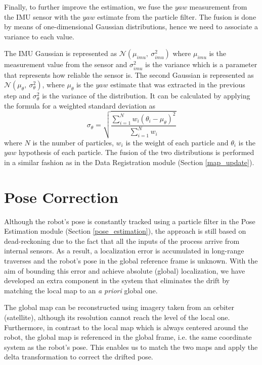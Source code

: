 Finally, to further improve the estimation, we fuse the $yaw$ measurement from
the IMU sensor with the $yaw$ estimate from the particle filter.
The fusion is done by means of one-dimensional Gaussian distributions,
hence we need to associate a variance to each value.

The IMU Gaussian is represented as $\mathcal{N}(\mu_{imu} ,\ \sigma^2_{imu})$
where $\mu_{imu}$ is the measurement value from the sensor and
$\sigma^2_{imu}$ is the variance which is a parameter that represents how
reliable the sensor is.
The second Gaussian is represented as
$\mathcal{N}(\mu_{\theta} ,\ \sigma^2_{\theta})$,
where $\mu_{\theta}$ is the $yaw$ estimate that was extracted in the
previous step and $\sigma^2_{\theta}$ is the variance of the distribution.
It can be calculated by applying the formula for a weighted standard
deviation as
\begin{equation}
    \sigma_\theta = \sqrt{\frac
    {\sum\limits^{N}_{i=1} w_i (\theta_i - \mu_\theta)^2}
    {\sum\limits^{N}_{i=1} w_i}}
\end{equation}
where
$N$ is the number of particles,
$w_i$ is the weight of each particle and
$\theta_i$ is the $yaw$ hypothesis of each particle.
The fusion of the two distributions is performed in a similar fashion as
in the Data Registration module (Section \ref{map_update}).

\section{Pose Correction} \label{pose_correction}

Although the robot's pose is constantly tracked using a particle filter in the
Pose Estimation module (Section \ref{pose_estimation}), the approach
is still based on dead-reckoning due to the fact that all the inputs
of the process arrive from internal sensors.
As a result, a localization error is accumulated in long-range traverses
and the robot's pose in the global reference frame is unknown.
With the aim of bounding this error and achieve absolute (global) localization,
we have developed an extra component in the system that eliminates
the drift by matching the local map to an \textit{a priori} global one.

The global map can be reconstructed using imagery taken from an
orbiter (satellite), although its resolution cannot reach the level of
the local one.
Furthermore, in contrast to the local map which is always centered around
the robot, the global map is referenced in the global frame, i.e. the
same coordinate system as the robot's pose.
This enables us to match the two maps and apply the delta transformation
to correct the drifted pose.


